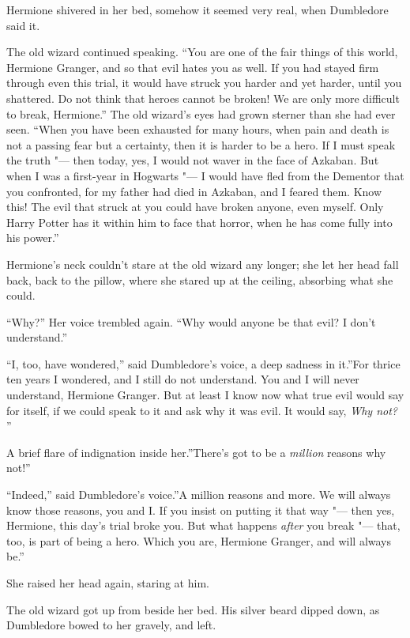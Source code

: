 Hermione shivered in her bed, somehow it seemed very real, when
Dumbledore said it.

The old wizard continued speaking. ``You are one of the fair things of
this world, Hermione Granger, and so that evil hates you as well. If you
had stayed firm through even this trial, it would have struck you harder
and yet harder, until you shattered. Do not think that heroes cannot be
broken! We are only more difficult to break, Hermione.'' The old
wizard's eyes had grown sterner than she had ever seen. ``When you have
been exhausted for many hours, when pain and death is not a passing fear
but a certainty, then it is harder to be a hero. If I must speak the
truth "--- then today, yes, I would not waver in the face of Azkaban. But
when I was a first-year in Hogwarts "--- I would have fled from the
Dementor that you confronted, for my father had died in Azkaban, and I
feared them. Know this! The evil that struck at you could have broken
anyone, even myself. Only Harry Potter has it within him to face that
horror, when he has come fully into his power.''

Hermione's neck couldn't stare at the old wizard any longer; she let her
head fall back, back to the pillow, where she stared up at the ceiling,
absorbing what she could.

``Why?'' Her voice trembled again. ``Why would anyone be that evil? I
don't understand.''

``I, too, have wondered,'' said Dumbledore's voice, a deep sadness in
it.''For thrice ten years I wondered, and I still do not understand. You
and I will never understand, Hermione Granger. But at least I know now
what true evil would say for itself, if we could speak to it and ask why
it was evil. It would say, \emph{Why not?} ''

A brief flare of indignation inside her.''There's got to be a
\emph{million} reasons why not!''

``Indeed,'' said Dumbledore's voice.''A million reasons and more. We
will always know those reasons, you and I. If you insist on putting it
that way "--- then yes, Hermione, this day's trial broke you. But what
happens \emph{after} you break "--- that, too, is part of being a hero.
Which you are, Hermione Granger, and will always be.''

She raised her head again, staring at him.

The old wizard got up from beside her bed. His silver beard dipped down,
as Dumbledore bowed to her gravely, and left.

